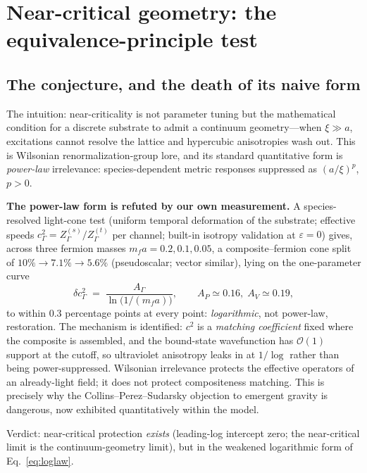 \documentclass[11pt,a4paper]{article}
\begin{document}
\section{Near-critical geometry: the equivalence-principle test}
\label{sec:epgeom}

\subsection{The conjecture, and the death of its naive form}

The intuition: near-criticality is not parameter tuning but the
mathematical condition for a discrete substrate to admit a
continuum geometry---when $\xi \gg a$, excitations cannot resolve
the lattice and hypercubic anisotropies wash out.
This is Wilsonian renormalization-group lore, and its standard
quantitative form is \emph{power-law} irrelevance:
species-dependent metric responses suppressed as $(a/\xi)^p$,
$p > 0$.

\textbf{The power-law form is refuted by our own measurement.}
A species-resolved light-cone test (uniform temporal deformation
of the substrate; effective speeds $c_\Gamma^2 = Z^{(s)}_\Gamma /
Z^{(t)}_\Gamma$ per channel; built-in isotropy validation at
$\varepsilon = 0$) gives, across three fermion masses
$m_f a = 0.2, 0.1, 0.05$, a composite--fermion cone split of
$10\% \to 7.1\% \to 5.6\%$ (pseudoscalar; vector similar), lying
on the one-parameter curve
\begin{equation}
\delta c^2_\Gamma \;=\; \frac{A_\Gamma}{\ln\!\bigl(1/(m_f a)\bigr)},
\qquad A_P \simeq 0.16,\; A_V \simeq 0.19,
\label{eq:loglaw}
\end{equation}
to within $0.3$ percentage points at every point:
\emph{logarithmic}, not power-law, restoration.
The mechanism is identified: $c^2$ is a \emph{matching
coefficient} fixed where the composite is assembled, and the
bound-state wavefunction has $\mathcal{O}(1)$ support at the
cutoff, so ultraviolet anisotropy leaks in at $1/\log$ rather
than being power-suppressed.  Wilsonian irrelevance protects the
effective operators of an already-light field; it does not
protect compositeness matching.  This is precisely why the
Collins--Perez--Sudarsky objection to emergent gravity is
dangerous, now exhibited quantitatively within the model.

Verdict: near-critical protection \emph{exists} (leading-log
intercept zero; the near-critical limit is the continuum-geometry
limit), but in the weakened logarithmic form of
Eq.~\eqref{eq:loglaw}.
\end{document}
